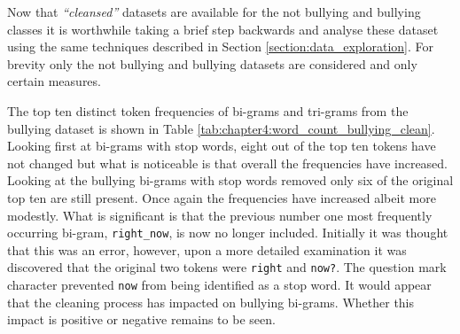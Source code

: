 Now that \textit{``cleansed''} datasets are available for the not bullying and bullying classes it is worthwhile taking a brief step backwards and analyse these dataset using the same techniques described in Section \ref{section:data_exploration}. For brevity only the not bullying and bullying datasets are considered and only certain measures.

The top ten distinct token frequencies of bi-grams and tri-grams from the bullying dataset is shown in Table \ref{tab:chapter4:word_count_bullying_clean}. Looking first at bi-grams with stop words, eight out of the top ten tokens have not changed but what is noticeable is that overall the frequencies have increased. Looking at the bullying bi-grams with stop words removed only six of the original top ten are still present. Once again the frequencies have increased albeit more modestly. What is significant is that the previous number one most frequently occurring  bi-gram, \verb|right_now|, is now no longer included. Initially it was thought that this was an error, however, upon a more detailed examination it was discovered that the original two tokens were \verb|right| and \verb|now?|. The question mark character prevented \verb|now| from being identified as a stop word. It would appear that the cleaning process has impacted on bullying bi-grams. Whether this impact is positive or negative remains to be seen.

